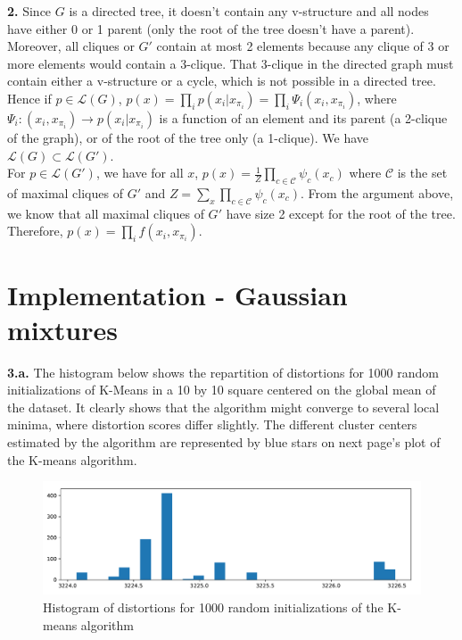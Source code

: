 \documentclass[11pt, oneside]{amsart}   	%
\begin{document}
 \textbf{2.} Since $G$ is a directed tree, it doesn't contain any v-structure and all nodes have either 0 or 1 parent (only the root of the tree doesn't have a parent). Moreover, all cliques or $G'$ contain at most 2 elements because any clique of 3 or more elements would contain a 3-clique. That 3-clique in the directed graph must contain either a v-structure or a cycle, which is not possible in a directed tree. 
 \\
 
 Hence if $p\in \mathcal{L}(G)$, $p(x) = \prod_i p(x_i | x_{\pi_i}) = \prod_i \Psi_i(x_i, x_{\pi_i})$, where $\Psi_i: (x_i, x_{\pi_i})\rightarrow p(x_i|x_{\pi_i})$ is a function of an element and its parent (a 2-clique of the graph), or of the root of the tree only (a 1-clique). We have $\boxed{\mathcal{L}(G) \subset \mathcal{L}(G')}$.
 \\
 
 For $p\in \mathcal{L}(G')$, we have for all $x$, $p(x) = \frac{1}{Z} \prod_{c\in\mathcal{C}} \psi_c(x_c)$ where $\mathcal{C}$ is the set of maximal cliques of $G'$ and $Z = \sum_x  \prod_{c\in\mathcal{C}} \psi_c(x_c)$. From the argument above, we know that all maximal cliques of $G'$ have size 2 except for the root of the tree. Therefore, $p(x) = \prod_i f(x_i, x_{\pi_i})$. 
 \vfill
 
 \clearpage
\section{Implementation - Gaussian mixtures}
 \vfill
 \textbf{3.a.} The histogram below shows the repartition of distortions for 1000 random initializations of K-Means in a 10 by 10 square centered on the global mean of the dataset. It clearly shows that the algorithm might converge to several local minima, where distortion scores differ slightly. The different cluster centers estimated by the algorithm are represented by blue stars on next page's plot of the K-means algorithm.
\begin{figure}[h!]
\centering
 \includegraphics[width=0.7\linewidth]{Distortions.pdf}
 \caption{Histogram of distortions for 1000 random initializations of the K-means algorithm}
\end{figure}
\vfill
\end{document}
